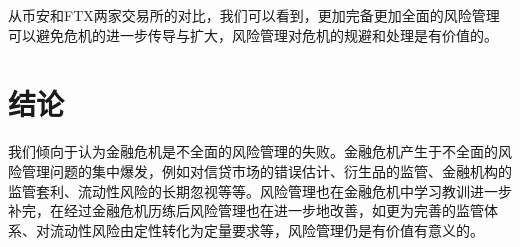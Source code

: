 从币安和FTX两家交易所的对比，我们可以看到，更加完备更加全面的风险管理可以避免危机的进一步传导与扩大，风险管理对危机的规避和处理是有价值的。

\section{结论}

我们倾向于认为金融危机是不全面的风险管理的失败。金融危机产生于不全面的风险管理问题的集中爆发，例如对信贷市场的错误估计、衍生品的监管、金融机构的监管套利、流动性风险的长期忽视等等。风险管理也在金融危机中学习教训进一步补完，在经过金融危机历练后风险管理也在进一步地改善，如更为完善的监管体系、对流动性风险由定性转化为定量要求等，风险管理仍是有价值有意义的。
